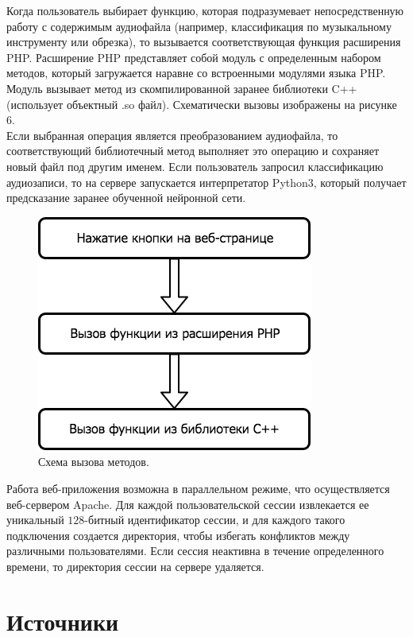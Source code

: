 \documentclass[14pt,a4paper]{article}
\begin{document}
Когда пользователь выбирает функцию, которая подразумевает непосредственную работу с содержимым аудиофайла (например, классификация по музыкальному инструменту или обрезка), то вызывается соответствующая функция расширения PHP. Расширение PHP представляет собой модуль с определенным набором методов, который загружается наравне со встроенными модулями языка PHP. Модуль вызывает метод из скомпилированной заранее библиотеки C++ (использует объектный .so файл). Схематически вызовы изображены на рисунке 6. \\

Если выбранная операция является преобразованием аудиофайла, то соответствующий библиотечный метод выполняет это операцию и сохраняет новый файл под другим именем. Если пользователь запросил классификацию аудиозаписи, то на сервере запускается интерпретатор Python3, который получает предсказание заранее обученной нейронной сети. \\

\begin{figure}[H]
\centering
\includegraphics[scale=0.5]{img/diagram.png}
\caption{Схема вызова методов.}
\label{fig:diagram}
\end{figure}

Работа веб-приложения возможна в параллельном режиме, что осуществляется веб-сервером Apache. Для каждой пользовательской сессии извлекается ее уникальный $128$-битный идентификатор сессии, и для каждого такого подключения создается директория, чтобы избегать конфликтов между различными пользователями. Если сессия неактивна в течение определенного времени, то директория сессии на сервере удаляется.

\newpage

\section[Источники]{\huge Источники}
\end{document}
